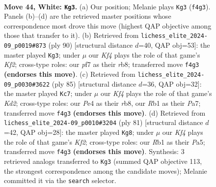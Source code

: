 \documentclass[11pt]{article}
\begin{document}
\clearpage

\begin{figure}[p]\centering
\begin{subfigure}{0.46\textwidth}\centering
\resizebox{\linewidth}{!}{%
\newchessgame
\chessboard[
  setfen={7r/1p3p2/pR2pk2/8/P3PK2/5P1P/7P/1R6 w - - 17 44},
  showmover=false,
  pgfstyle=straightmove, color=movearrow, markmove={f4-g3}
]}
\caption{}
\end{subfigure}\hfill
\begin{subfigure}{0.46\textwidth}\centering
\resizebox{\linewidth}{!}{%
\newchessgame
\chessboard[
  setfen={1r6/8/1p1R1pk1/p7/P1P1r1p1/1P1R4/5KP1/8 w - - 4 46},
  showmover=false,
  pgfstyle=straightmove, color=movearrow, markmove={f2-g3}
]}
\caption{}
\end{subfigure}
\\[4pt]
\begin{subfigure}{0.46\textwidth}\centering
\resizebox{\linewidth}{!}{%
\newchessgame
\chessboard[
  setfen={1R6/p2k1rp1/2p4p/r7/P1P1p2P/6P1/5P2/4RK2 b - - 1 43},
  showmover=false,
  pgfstyle=straightmove, color=movearrow, markmove={d7-c7}
]}
\caption{}
\end{subfigure}\hfill
\begin{subfigure}{0.46\textwidth}\centering
\resizebox{\linewidth}{!}{%
\newchessgame
\chessboard[
  setfen={8/1R3kp1/6p1/p2p2Pp/r2P1K2/2P2P2/8/8 b - - 3 41},
  showmover=false,
  pgfstyle=straightmove, color=movearrow, markmove={f7-g8}
]}
\caption{}
\end{subfigure}
\caption{\textbf{Move 44, White: \texttt{Kg3}.} (a) Our position; Melanie plays \texttt{Kg3} (\texttt{f4g3}). Panels (b)--(d) are the retrieved master positions whose correspondence most drove this move (highest QAP objective among those that transfer to it). (b) Retrieved from \texttt{lichess\_elite\_2024-09\_p0019\#873} (ply 90) [structural distance $d$=40, QAP obj=53]: the master played \texttt{Kg3}; under $\mu$ our \emph{Kf4} plays the role of that game's \emph{Kf2}; cross-type roles: our \emph{p}f7 as their \emph{r}b8; transferred move \texttt{f4g3} \textbf{(endorses this move)}. (c) Retrieved from \texttt{lichess\_elite\_2024-09\_p0030\#3622} (ply 85) [structural distance $d$=36, QAP obj=32]: the master played \texttt{Kc7}; under $\mu$ our \emph{Kf4} plays the role of that game's \emph{Kd2}; cross-type roles: our \emph{P}e4 as their \emph{r}b8, our \emph{R}b1 as their \emph{P}a7; transferred move \texttt{f4g3} \textbf{(endorses this move)}. (d) Retrieved from \texttt{lichess\_elite\_2024-09\_p0010\#3204} (ply 81) [structural distance $d$=42, QAP obj=28]: the master played \texttt{Kg8}; under $\mu$ our \emph{Kf4} plays the role of that game's \emph{Kf2}; cross-type roles: our \emph{R}b1 as their \emph{P}a5; transferred move \texttt{f4g3} \textbf{(endorses this move)}. Synthesis: 3 retrieved analogs transferred to \texttt{Kg3} (summed QAP objective 113, the strongest correspondence among the candidate moves); Melanie committed it via the \texttt{search} selector.}
\label{fig:thought-m86}
\end{figure}
\end{document}
